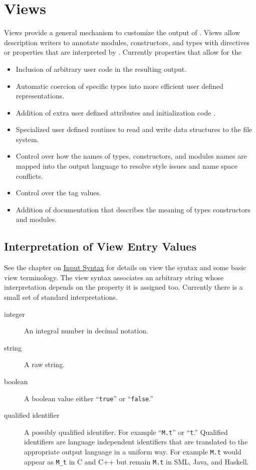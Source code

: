 %
\chapter{Views}
\label{chap:views}

Views provide a general mechanism to customize the output of
\asdlgen{}.
Views allow description writers to annotate modules,
constructors, and types with directives or properties that are interpreted
by \asdlgen{}.
Currently \asdlgen{} properties that allow for the 
\begin{itemize}
  \item
    Inclusion of arbitrary user code in the resulting output.
  \item
    Automatic coercion of specific types into more efficient user
    defined representations.
  \item
    Addition of extra user defined attributes and initialization code .
  \item
    Specialized user defined routines to read and write data structures to the
    file system.
  \item
    Control over how the names of types, constructors, and modules names
    are mapped into the output language to resolve style issues and name space
    conflicts.
  \item
    Control over the tag values.
  \item
    Addition of documentation that describes the meaning of types
    constructors and modules.
\end{itemize}%

\section{Interpretation of View Entry Values}

See the chapter on \hyperref[chap:syntax]{Input Syntax} for details on
view the syntax and some basic view terminology. The view syntax associates
an arbitrary string whose interpretation depends on the property it is
assigned too. Currently there is a small set of standard interpretations.

\begin{description}
  \item[integer]
    An integral number in decimal notation.
  \item[string]
    A raw string.
  \item[boolean]
    A boolean value either ``\lstinline!true!'' or ``\lstinline!false!.''
  \item[qualified identifier]
    A possibly qualified identifier.
    For example ``\lstinline!M.t!'' or ``\lstinline!t!.''
    Qualified identifiers are language independent
    identifiers that are translated to the appropriate output language in a
    uniform way.
    For example \lstinline!M.t! would appear as \lstinline!M_t! in C and C++ but
    remain \lstinline!M.t! in SML, Java, and Haskell.
\end{description}%

